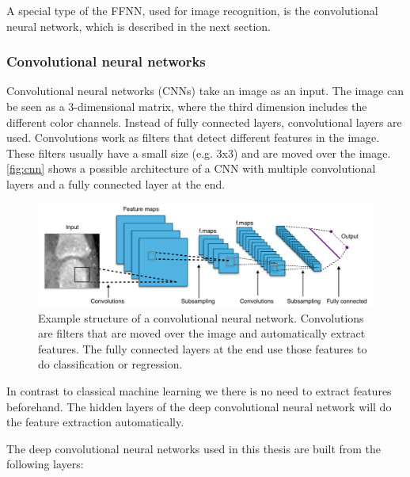 \documentclass[12pt]{article}
\begin{document}
A special type of the FFNN, used for image recognition, is the convolutional neural network, which is described in the next section.

\subsubsection{Convolutional neural networks}
\label{subsubsec:cnn}
Convolutional neural networks (CNNs) take an image as an input. The image can be seen as a 3-dimensional matrix, where the third dimension includes the different color channels. Instead of fully connected layers, convolutional layers are used. Convolutions work as filters that detect different features in the image. These filters usually have a small size (e.g. 3x3) and are moved over the image. \autoref{fig:cnn} shows a possible architecture of a CNN with multiple convolutional layers and a fully connected layer at the end.

\begin{figure}[ht]
\includegraphics[width=5in]{cnn}	
\caption{Example structure of a convolutional neural network. Convolutions are filters that are moved over the image and automatically extract features. The fully connected layers at the end use those features to do classification or regression.}
\label{fig:cnn}
\end{figure}


In contrast to classical machine learning we there is no need to extract features beforehand. The hidden layers of the deep convolutional neural network will do the feature extraction automatically.

The deep convolutional neural networks used in this thesis are built from the following layers:
\end{document}
